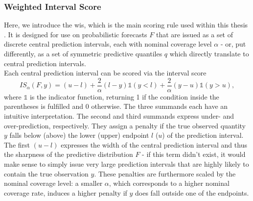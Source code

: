 \subsubsection{Weighted Interval Score} \label{ssub:weighted_interval_score}
Here, we introduce the \ac{wis}, which is the main scoring rule used within this thesis \cite{bracher_evaluating_2021}. It is designed for use on probabilistic forecasts  $F$ that are issued as a set of discrete central prediction intervals, each with nominal coverage level $\alpha$ - or, put differently, as a set of symmetric predictive quantiles $q$ which directly translate to central prediction intervals. \\
Each central prediction interval can be scored via the interval score \citep{gneiting_strictly_2007}
\begin{equation}
IS_{\alpha}(F, y) = (u-l) + \frac{2}{\alpha}(l - y)\mathbb{1}(y < l) + \frac{2}{\alpha}(y - u)\mathbb{1}(y > u),
\end{equation}
where $\mathbb{1}$ is the indicator function, returning 1 if the condition inside the parentheses is fulfilled and 0 otherwise. The three summands each have an intuitive interpretation. The second and third summands express under- and over-prediction, respectively. They assign a penalty if the true observed quantity $y$ falls below (above) the lower (upper) endpoint $l$ ($u$) of the prediction interval. The first $(u-l)$ expresses the width of the central prediction interval and thus the sharpness of the predictive distribution $F$ - if this term didn't exist, it would make sense to simply issue very large prediction intervals that are highly likely to contain the true observation $y$. These penalties are furthermore scaled by the nominal coverage level: a smaller $\alpha$, which corresponds to a higher nominal coverage rate, induces a higher penalty if $y$ does fall outside one of the endpoints. \\
